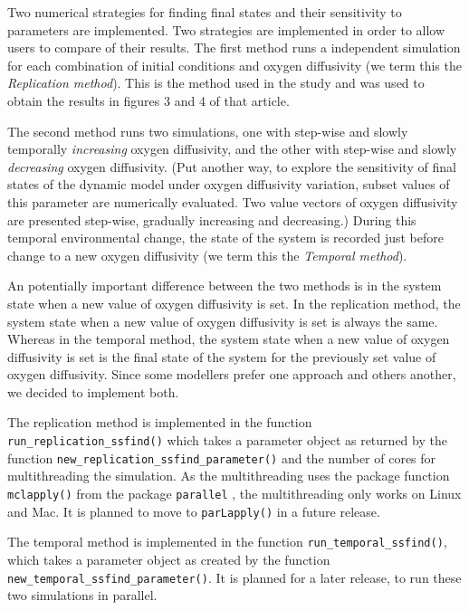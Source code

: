 \documentclass[]{elsarticle} %
\begin{document}
Two numerical strategies for finding final states and their sensitivity to parameters are implemented. Two strategies are implemented in order to allow users to compare of their results. The first method runs a independent simulation for each combination of initial conditions and oxygen diffusivity (we term this the \emph{Replication method}). This is the method used in the \citet{Bush2017} study and was used to obtain the results in figures 3 and 4 of that article.

The second method runs two simulations, one with step-wise and slowly temporally \emph{increasing} oxygen diffusivity, and the other with step-wise and slowly \emph{decreasing} oxygen diffusivity. (Put another way, to explore the sensitivity of final states of the dynamic model under oxygen diffusivity variation, subset values of this parameter are numerically evaluated. Two value vectors of oxygen diffusivity are presented step-wise, gradually increasing and decreasing.) During this temporal environmental change, the state of the system is recorded just before change to a new oxygen diffusivity (we term this the \emph{Temporal method}).

An potentially important difference between the two methods is in the system state when a new value of oxygen diffusivity is set. In the replication method, the system state when a new value of oxygen diffusivity is set is always the same. Whereas in the temporal method, the system state when a new value of oxygen diffusivity is set is the final state of the system for the previously set value of oxygen diffusivity. Since some modellers prefer one approach and others another, we decided to implement both.

The replication method is implemented in the function \texttt{run\_replication\_ssfind()} which takes a parameter object as returned by the function \texttt{new\_replication\_ssfind\_parameter()} and the number of cores for multithreading the simulation. As the multithreading uses the package function \texttt{mclapply()} from the package \texttt{parallel} \citep{RCoreTeam2022}, the multithreading only works on Linux and Mac. It is planned to move to \texttt{parLapply()} \citep{RCoreTeam2022} in a future release.

The temporal method is implemented in the function \texttt{run\_temporal\_ssfind()}, which takes a parameter object as created by the function \texttt{new\_temporal\_ssfind\_parameter()}. It is planned for a later release, to run these two simulations in parallel.
\end{document}
